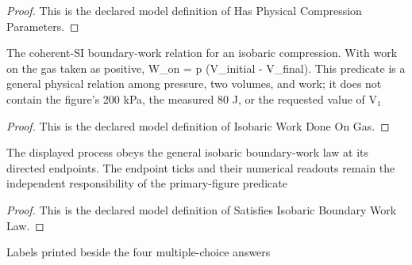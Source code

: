 \begin{proof}
  This is the declared model definition of Has Physical Compression Parameters.
\end{proof}
\begin{definition}
  \label{def:physics:phyx-mini-0404:phyxminiproblems-problemphyxmini0404-isobaricworkdoneongas}
  The coherent-SI boundary-work relation for an isobaric compression. With work on the gas taken as positive, W\_on = p (V\_initial - V\_final). This predicate is a general physical relation among pressure, two volumes, and work; it does not contain the figure's 200 kPa, the measured 80 J, or the requested value of V₁
\end{definition}
\begin{proof}
  This is the declared model definition of Isobaric Work Done On Gas.
\end{proof}
\begin{definition}
  \label{def:physics:phyx-mini-0404:phyxminiproblems-problemphyxmini0404-satisfiesisobaricboundaryworklaw}
  The displayed process obeys the general isobaric boundary-work law at its directed endpoints. The endpoint ticks and their numerical readouts remain the independent responsibility of the primary-figure predicate
\end{definition}
\begin{proof}
  This is the declared model definition of Satisfies Isobaric Boundary Work Law.
\end{proof}
\begin{definition}
  \label{def:physics:phyx-mini-0404:phyxminiproblems-problemphyxmini0404-answerchoice}
  Labels printed beside the four multiple-choice answers
\end{definition}
